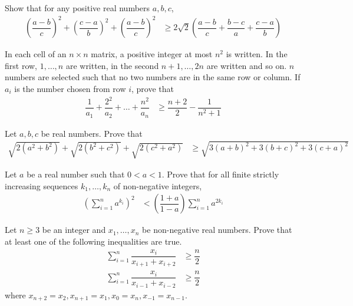 \documentclass{subfile}
\begin{document}
		\begin{problem}
			Show that for any positive real numbers $a,b,c$,
				\begin{align*}
					\left(\dfrac{a-b}{c}\right)^{2}+\left(\dfrac{c-a}{b}\right)^{2}+\left(\dfrac{a-b}{c}\right)^{2}
						& \geq 2\sqrt{2}\left(\dfrac{a-b}{c}+\dfrac{b-c}{a}+\dfrac{c-a}{b}\right)
				\end{align*}
		\end{problem}
	
		\begin{problem}
			In each cell of an $n\times n$ matrix, a positive integer at most $n^{2}$ is written. In the first row, $1,\ldots,n$ are written, in the second $n+1,\ldots,2n$ are written and so on. $n$ numbers are selected such that no two numbers are in the same row or column. If $a_{i}$ is the number chosen from row $i$, prove that
				\begin{align*}
					\dfrac{1}{a_{1}}+\dfrac{2^{2}}{a_{2}}+\ldots+\dfrac{n^{2}}{a_{n}}
						& \geq \dfrac{n+2}{2}-\dfrac{1}{n^{2}+1}
				\end{align*}
		\end{problem}
	
		\begin{problem}
			Let $a,b,c$ be real numbers. Prove that
				\begin{align*}
					\sqrt{2(a^{2}+b^{2})}+\sqrt{2(b^{2}+c^{2})}+\sqrt{2(c^{2}+a^{2})}
						& \geq \sqrt{3(a+b)^{2}+3(b+c)^{2}+3(c+a)^{2}}
				\end{align*}
		\end{problem}
	
		\begin{problem}
			Let $a$ be a real number such that $0<a<1$. Prove that for all finite strictly increasing sequences $k_{1},\ldots,k_{n}$ of non-negative integers,
				\begin{align*}
					\left(\sum_{i=1}^{n}a^{k_{i}}\right)^{2}
						& < \left(\dfrac{1+a}{1-a}\right)\sum_{i=1}^{n}a^{2k_{i}}
				\end{align*}
		\end{problem}
	
		\begin{problem}
			Let $n\geq 3$ be an integer and $x_{1},\ldots,x_{n}$ be non-negative real numbers. Prove that at least one of the following inequalities are true.
				\begin{align*}
					\sum_{i=1}^{n}\dfrac{x_{i}}{x_{i+1}+x_{i+2}}
						& \geq \dfrac{n}{2}\\
					\sum_{i=1}^{n}\dfrac{x_{i}}{x_{i-1}+x_{i-2}}
						& \geq \dfrac{n}{2}
				\end{align*}
			where $x_{n+2}=x_{2},x_{n+1}=x_{1},x_{0}=x_{n},x_{-1}=x_{n-1}$.
		\end{problem}
	
\end{document}
